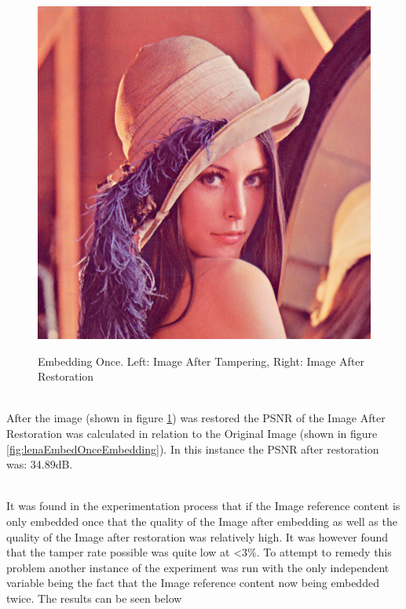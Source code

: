 \documentclass[12pt]{article}
\begin{document}
\begin{figure}[h]
{\includegraphics[scale=0.45]{"Lena Embed once 0.7 threshold/finalImageAfterRestoration"}%
}%
\caption{Embedding Once. Left: Image After Tampering, Right: Image After Restoration}
\label{fig:lenaEmbedOnceRestoration}
\end{figure}

\hspace{0pt} \\
After the image (shown in figure \ref{fig:lenaEmbedOnceRestoration}) was restored the PSNR of the Image After Restoration was calculated in relation to the Original Image (shown in figure \ref{fig:lenaEmbedOnceEmbedding}).
In this instance the PSNR after restoration was: 34.89dB.

\hspace{0pt} \\
It was found in the experimentation process that if the Image reference content is only embedded once that the quality of the Image after embedding as well as the quality of the Image after restoration was relatively high.
It was however found that the tamper rate possible was quite low at \textless 3\%.
To attempt to remedy this problem another instance of the experiment was run with the only independent variable being the fact that the Image reference content now being embedded twice.
The results can be seen below
\end{document}
